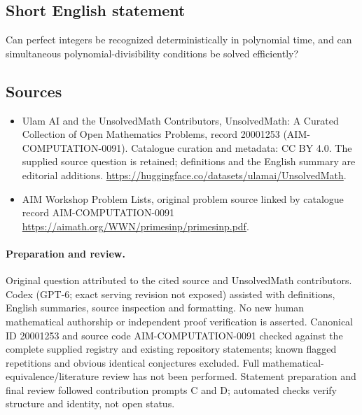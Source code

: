 \documentclass[11pt]{article}
\begin{document}
\subsection{Short English statement}
Can perfect integers be recognized deterministically in polynomial time, and can simultaneous polynomial-divisibility conditions be solved efficiently?
\subsection{Sources}
\begin{itemize}
\item[\hypertarget{source:20001253:1}{S1}] Ulam AI and the UnsolvedMath Contributors, UnsolvedMath: A Curated Collection of Open Mathematics Problems, record 20001253 (AIM-COMPUTATION-0091). Catalogue curation and metadata: CC BY 4.0. The supplied source question is retained; definitions and the English summary are editorial additions.
\url{https://huggingface.co/datasets/ulamai/UnsolvedMath}.
\item[\hypertarget{source:20001253:2}{S2}] AIM Workshop Problem Lists, original problem source linked by catalogue record AIM-COMPUTATION-0091
\url{https://aimath.org/WWN/primesinp/primesinp.pdf}.
\end{itemize}
\paragraph{Preparation and review.}
Original question attributed to the cited source and UnsolvedMath contributors. Codex (GPT-6; exact serving revision not exposed) assisted with definitions, English summaries, source inspection and formatting. No new human mathematical authorship or independent proof verification is asserted. Canonical ID 20001253 and source code AIM-COMPUTATION-0091 checked against the complete supplied registry and existing repository statements; known flagged repetitions and obvious identical conjectures excluded. Full mathematical-equivalence/literature review has not been performed. Statement preparation and final review followed contribution prompts C and D; automated checks verify structure and identity, not open status.
\label{end:20001253}
\end{document}
